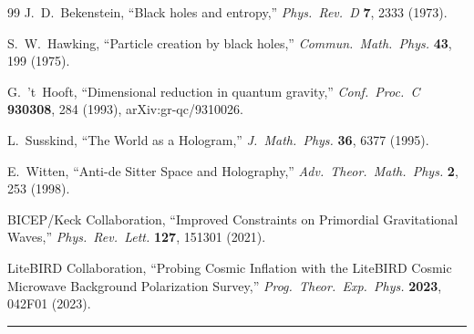 \documentclass[12pt,a4paper]{article}
\begin{document}
\begin{thebibliography}{99}
 J.~D.~Bekenstein,
``Black holes and entropy,''
\textit{Phys.\ Rev.\ D} \textbf{7}, 2333 (1973).

 S.~W.~Hawking,
``Particle creation by black holes,''
\textit{Commun.\ Math.\ Phys.} \textbf{43}, 199 (1975).

 G.~'t~Hooft,
``Dimensional reduction in quantum gravity,''
\textit{Conf.\ Proc.\ C} \textbf{930308}, 284 (1993), arXiv:gr-qc/9310026.

 L.~Susskind,
``The World as a Hologram,''
\textit{J.\ Math.\ Phys.} \textbf{36}, 6377 (1995).

 E.~Witten,
``Anti-de Sitter Space and Holography,''
\textit{Adv.\ Theor.\ Math.\ Phys.} \textbf{2}, 253 (1998).

 BICEP/Keck Collaboration,
``Improved Constraints on Primordial Gravitational Waves,''
\textit{Phys.\ Rev.\ Lett.} \textbf{127}, 151301 (2021).

 LiteBIRD Collaboration,
``Probing Cosmic Inflation with the LiteBIRD Cosmic Microwave Background Polarization Survey,''
\textit{Prog.\ Theor.\ Exp.\ Phys.} \textbf{2023}, 042F01 (2023).

\end{thebibliography}

\vspace{2em}
\noindent\rule{\textwidth}{0.5pt}
\end{document}
